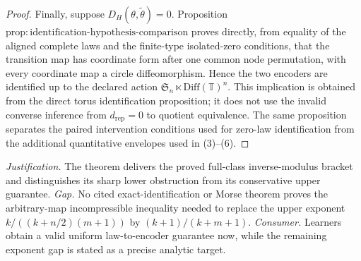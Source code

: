 \documentclass{article}
\begin{document}
\begin{proof}
Finally, suppose \(D_H(\theta,\widetilde\theta)=0\). Proposition \(\mathrm{prop:identification\text{-}hypothesis\text{-}comparison}\) proves directly, from equality of the aligned complete laws and the finite-type isolated-zero conditions, that the transition map has coordinate form after one common node permutation, with every coordinate map a circle diffeomorphism. Hence the two encoders are identified up to the declared action \(\mathfrak S_n\ltimes\mathrm{Diff}(\mathbb T)^n\). This implication is obtained from the direct torus identification proposition; it does not use the invalid converse inference from \(d_{\mathrm{rep}}=0\) to quotient equivalence. The same proposition separates the paired intervention conditions used for zero-law identification from the additional quantitative envelopes used in (3)--(6).
\end{proof}
\par\smallskip\noindent \textit{Justification.} The theorem delivers the proved full-class inverse-modulus bracket and distinguishes its sharp lower obstruction from its conservative upper guarantee. \textit{Gap.} No cited exact-identification or Morse theorem proves the arbitrary-map incompressible inequality needed to replace the upper exponent \(k/((k+n/2)(m+1))\) by \((k+1)/(k+m+1)\). \textit{Consumer.} Learners obtain a valid uniform law-to-encoder guarantee now, while the remaining exponent gap is stated as a precise analytic target.
\end{document}
